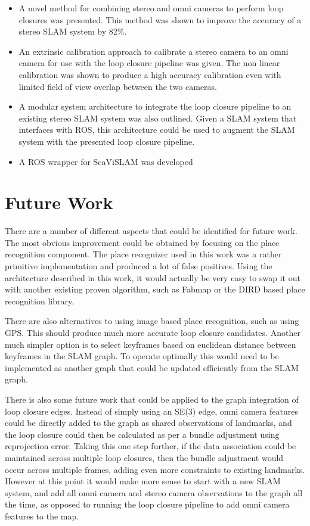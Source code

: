 \begin{itemize}
 \item A novel method for combining stereo and omni cameras to perform loop closures was presented.  This method was shown to improve the accuracy of a stereo SLAM system by 82\%.
 \item An extrinsic calibration approach to calibrate a stereo camera to an omni camera for use with the loop closure pipeline was given.  The non linear calibration was shown to produce a high accuracy calibration even with limited field of view overlap between the two cameras.
 \item A modular system architecture to integrate the loop closure pipeline to an existing stereo SLAM system was also outlined.  Given a SLAM system that interfaces with ROS, this architecture could be used to augment the SLAM system with the presented loop closure pipeline.
 \item A ROS wrapper for ScaViSLAM was developed
\end{itemize}

\section{Future Work}


There are a number of different aspects that could be identified for future work.  The most obvious improvement could be obtained by focusing on the place recognition component.  The place recognizer used in this work was a rather primitive implementation and produced a lot of false positives.  Using the architecture described in this work, it would actually be very easy to swap it out with another existing proven algorithm, such as Fabmap or the DIRD based place recognition library.

There are also alternatives to using image based place recognition, such as using GPS.  This should produce much more accurate loop closure candidates.  Another much simpler option is to select keyframes based on euclidean distance between keyframes in the SLAM graph.  To operate optimally this would need to be implemented as another graph that could be updated efficiently from the SLAM graph.

There is also some future work that could be applied to the graph integration of loop closure edges.  Instead of simply using an SE(3) edge, omni camera features could be directly added to the graph as shared observations of landmarks, and the loop closure could then be calculated as per a bundle adjustment using reprojection error.  Taking this one step further, if the data association could be maintained across multiple loop closures, then the bundle adjustment would occur across multiple frames, adding even more constraints to existing landmarks.  However at this point it would make more sense to start with a new SLAM system, and add all omni camera and stereo camera observations to the graph all the time, as opposed to running the loop closure pipeline to add omni camera features to the map.

